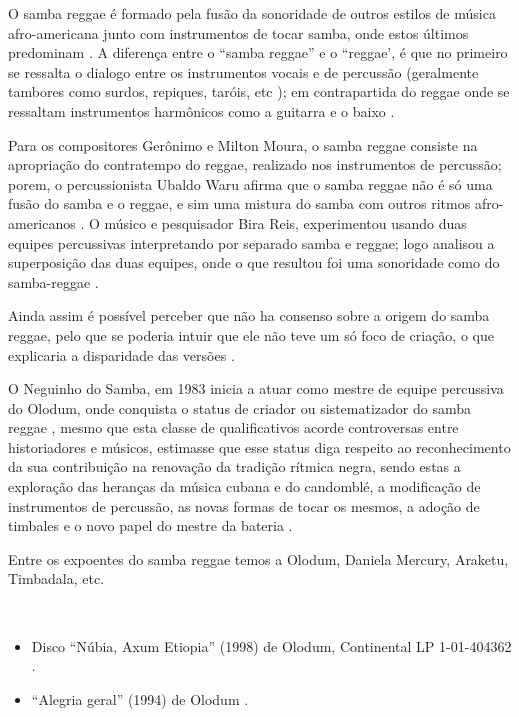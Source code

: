 \begin{description}
O samba reggae é formado pela fusão da sonoridade de outros estilos de música 
afro-americana junto com instrumentos de tocar samba, onde estos últimos predominam \cite[pp. 187]{casa1992anales} \cite[pp. 57]{guerreiro2000trama}.
A diferença entre o ``samba reggae'' e o ``reggae', 
é que no primeiro se ressalta o dialogo entre os instrumentos vocais e de percussão 
(geralmente tambores como surdos, repiques, taróis, etc \cite[pp. 178]{diniz2008almanaque});
em contrapartida do reggae onde se ressaltam instrumentos harmônicos como a guitarra e o baixo
\cite[pp. 57]{guerreiro2000trama}.

Para os compositores Gerônimo e Milton Moura, o samba reggae consiste na apropriação do contratempo do reggae,
realizado nos instrumentos de percussão;
porem, o percussionista Ubaldo Waru afirma que o samba reggae não é só uma fusão do samba e o reggae,
e sim uma mistura do samba com outros ritmos afro-americanos  \cite[pp. 57]{guerreiro2000trama}.
O músico e pesquisador Bira Reis, experimentou usando duas equipes percussivas 
interpretando por separado samba e reggae; 
logo analisou a superposição das duas equipes, onde o que resultou foi uma sonoridade como do samba-reggae \cite[pp. 57]{guerreiro2000trama}. 

Ainda assim é possível perceber que não ha consenso sobre a origem do samba reggae,
pelo que se poderia intuir que ele não teve um só foco de criação,
o que explicaria a disparidade das versões  \cite[pp. 58]{guerreiro2000trama}.

O  Neguinho do Samba, 
em 1983 inicia a atuar como mestre de equipe percussiva do Olodum, onde conquista o
status de criador ou sistematizador do samba reggae \cite[pp. 178]{diniz2008almanaque} \cite[pp. 58-60]{guerreiro2000trama}, 
mesmo que esta classe de qualificativos 
acorde controversas entre historiadores e músicos, estimasse que esse status
diga respeito ao reconhecimento da sua contribuição na renovação da tradição rítmica negra, sendo estas
a exploração das heranças da música cubana e do candomblé,
a modificação de instrumentos de percussão, as novas formas de tocar os mesmos,
a adoção de timbales e
o novo papel do mestre da bateria \cite[pp. 178]{diniz2008almanaque} \cite[pp. 58-60]{guerreiro2000trama}.

Entre os expoentes do samba reggae temos a Olodum, Daniela Mercury, Araketu, Timbadala,  etc.

\begin{example} ~

\begin{itemize}
\item Disco ``Núbia, Axum Etiopia'' (1998) de Olodum, Continental LP 1-01-404362 \cite[pp. 187]{casa1992anales}.
\item ``Alegria geral'' (1994) de Olodum \cite[pp. 207]{dunn2014brutality}.
\end{itemize}
\end{example}

\end{description}


